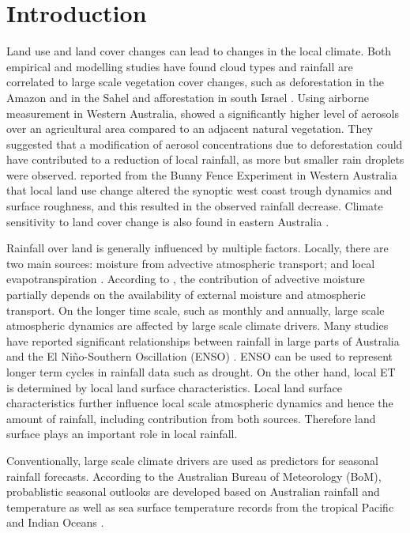 \documentclass[draft,linenumbers]{agujournal}
\begin{document}
\section{Introduction}

Land use and land cover changes can lead to changes in the local climate. Both empirical and modelling studies have found cloud types and rainfall are correlated to large scale vegetation cover changes, such as deforestation in the Amazon and in the Sahel \citep{Chagnon2005,Pinto2009, Wang2009, Mei2010, kucharski_further_2013,pitman_scale_2016} and afforestation in south Israel \citep{Otterman1990, Ben-Gai1998}. Using airborne measurement in Western Australia, \citet{Junkermann2009} showed a significantly higher level of aerosols over an agricultural area compared to an adjacent natural vegetation. They suggested that a modification of aerosol concentrations due to deforestation could have contributed to a reduction of local rainfall, as more but smaller rain droplets were observed. \citet{Nair2011} reported from the Bunny Fence Experiment in Western Australia that local land use change altered the synoptic west coast trough dynamics and surface roughness, and this resulted in the observed rainfall decrease. Climate sensitivity to land cover change is also found in eastern Australia \citep{McAlpine2007}. 

Rainfall over land is generally influenced by multiple factors. Locally, there are two main sources: moisture from advective atmospheric transport; and local evapotranspiration \citep{Eltahir1996,Bosilovich2006,Dirmeyer2009,Gimeno2010}. According to \citet{Trenberth1999}, the contribution of advective moisture partially depends on the availability of external moisture and atmospheric transport. On the longer time scale, such as monthly and annually, large scale atmospheric dynamics are affected by large scale climate drivers. Many studies have reported significant relationships between rainfall in large parts of Australia and the El Ni\~{n}o-Southern Oscillation (ENSO) \citep{Verdon2004,Risbey2009,Speer2011}. ENSO can be used to represent longer term cycles in rainfall data such as drought. On the other hand, local ET is determined by local land surface characteristics. Local land surface characteristics further influence local scale atmospheric dynamics and hence the amount of rainfall, including contribution from both sources. Therefore land surface plays an important role in local rainfall. 

Conventionally, large scale climate drivers are used as predictors for seasonal rainfall forecasts. According to the Australian Bureau of Meteorology (BoM), probablistic seasonal outlooks are developed based on Australian rainfall and temperature as well as sea surface temperature records from the tropical Pacific and Indian Oceans \citep{BoM2012c}. 
\end{document}
